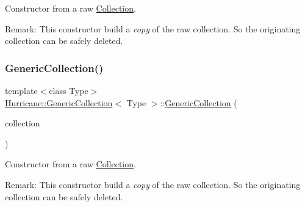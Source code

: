 Constructor from a raw \hyperlink{classHurricane_1_1Collection}{Collection}.

\begin{DoxyParagraph}{Remark\+:}
This constructor build a {\itshape copy} of the raw collection. So the originating collection can be safely deleted. 
\end{DoxyParagraph}
\mbox{\label{classHurricane_1_1GenericCollection_a9b77dc014864c2248f31b9dfee242d25}} 
\subsubsection{\texorpdfstring{Generic\+Collection()}{GenericCollection()}\hspace{0.1cm}{\footnotesize\ttfamily [2/3]}}
{\footnotesize\ttfamily template$<$class Type$>$ \\
\hyperlink{classHurricane_1_1GenericCollection}{Hurricane\+::\+Generic\+Collection}$<$ Type $>$\+::\hyperlink{classHurricane_1_1GenericCollection}{Generic\+Collection} (\begin{DoxyParamCaption}\item[{const \hyperlink{classHurricane_1_1GenericCollection}{Generic\+Collection}$<$ Type $>$ \&}]{collection }\end{DoxyParamCaption})\hspace{0.3cm}{\ttfamily [inline]}}

Constructor from a raw \hyperlink{classHurricane_1_1Collection}{Collection}.

\begin{DoxyParagraph}{Remark\+:}
This constructor build a {\itshape copy} of the raw collection. So the originating collection can be safely deleted. 
\end{DoxyParagraph}
\mbox{\label{classHurricane_1_1GenericCollection_a8e4f70213efb85c0ba802b7de9c03b32}} 

